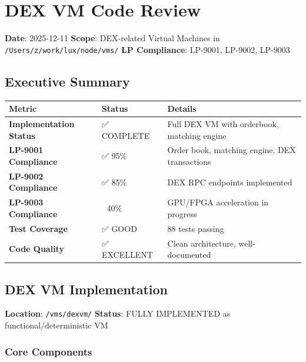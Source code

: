 \documentclass[
]{article}
\author{}
\date{}
\newcounter{none} %
\begin{document}
\section{DEX VM Code Review}\label{dex-vm-code-review}

\textbf{Date}: 2025-12-11 \textbf{Scope}: DEX-related Virtual Machines
in \texttt{/Users/z/work/lux/node/vms/} \textbf{LP Compliance}: LP-9001,
LP-9002, LP-9003

\subsection{Executive Summary}\label{executive-summary}

{\def\LTcaptype{none} %
\begin{longtable}[]{@{}lll@{}}
\toprule\noalign{}
Metric & Status & Details \\
\midrule\noalign{}
\endhead
\bottomrule\noalign{}
\endlastfoot
\textbf{Implementation Status} & ✅ COMPLETE & Full DEX VM with
orderbook, matching engine \\
\textbf{LP-9001 Compliance} & ✅ 95\% & Order book, matching engine, DEX
transactions \\
\textbf{LP-9002 Compliance} & ✅ 85\% & DEX RPC endpoints implemented \\
\textbf{LP-9003 Compliance} & 🔄 40\% & GPU/FPGA acceleration in
progress \\
\textbf{Test Coverage} & ✅ GOOD & 88 tests passing \\
\textbf{Code Quality} & ✅ EXCELLENT & Clean architecture,
well-documented \\
\end{longtable}
}

\subsection{DEX VM Implementation}\label{dex-vm-implementation}

\textbf{Location}: \texttt{/vms/dexvm/} \textbf{Status}: FULLY
IMPLEMENTED as functional/deterministic VM

\subsubsection{Core Components}\label{core-components}
\end{document}
